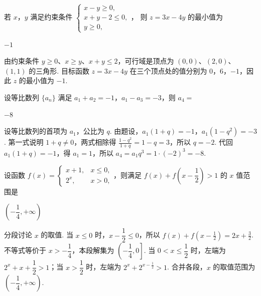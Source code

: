 \begin{problem}
若 \(x\)，\(y\) 满足约束条件
\(\begin{cases}
x-y\ge 0,\\
x+y-2\le 0,\\
y\ge 0,
\end{cases}\)，
则 \(z=3x-4y\) 的最小值为\fillinblank{}
\end{problem}

\begin{answer}
\(-1\)
\end{answer}

\begin{solution}
由约束条件 \(y\ge0\)、\(x\ge y\)、\(x+y\le2\)，可行域是顶点为 \((0,0)\)、\((2,0)\)、\((1,1)\) 的三角形. 目标函数 \(z=3x-4y\) 在三个顶点处的值分别为 \(0\)，\(6\)，\(-1\)，因此 \(z\) 的最小值为 \(-1\).
\end{solution}

\begin{problem}
设等比数列 \(\{a_n\}\) 满足 \(a_1+a_2=-1\)，\(a_1-a_3=-3\)，则 \(a_4=\)\fillinblank{}
\end{problem}

\begin{answer}
\(-8\)
\end{answer}

\begin{solution}
设等比数列的首项为 \(a_1\)，公比为 \(q\). 由题设，\(a_1(1+q)=-1\)，\(a_1(1-q^2)=-3\). 第一式说明 \(1+q\ne0\)，两式相除得 \(\frac{1-q^2}{1+q}=1-q=3\)，所以 \(q=-2\). 代回 \(a_1(1+q)=-1\)，得 \(a_1=1\)，所以 \(a_4=a_1q^3=1\cdot(-2)^3=-8\).
\end{solution}

\begin{problem}
设函数 \(f(x)=\begin{cases}
x+1,&x\le 0,\\
2^x,&x>0,
\end{cases}\)，则满足 \(f(x)+f\left(x-\dfrac12\right)>1\) 的 \(x\) 值范围是\fillinblank{}
\end{problem}

\begin{answer}
\(\left(-\dfrac14,+\infty\right)\)
\end{answer}

\begin{solution}
分段讨论 \(x\) 的取值. 当 \(x\le0\) 时，\(x-\dfrac12\le0\)，所以 \(f(x)+f\left(x-\frac12\right)=2x+\frac32\).
不等式等价于 \(x>-\dfrac14\)，本段解集为 \(\left(-\dfrac14,0\right]\). 当 \(0<x\le\dfrac12\) 时，左端为 \(2^x+x+\dfrac12>1\)；当 \(x>\dfrac12\) 时，左端为 \(2^x+2^{x-\frac12}>1\). 合并各段，\(x\) 的取值范围为 \(\left(-\dfrac14,+\infty\right)\).
\end{solution}

